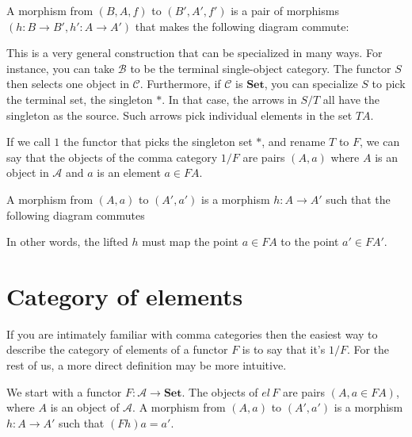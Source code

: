 \documentclass[11pt]{amsart}
\newcommand{\Cat}[1]{\mathbf{#1}}
\newcommand{\cat}[1]{\mathcal{#1}}
\begin{document}
 A morphism from $(B, A, f)$ to $(B', A', f')$ is a pair of morphisms $(h \colon B \to B', h' \colon A \to A')$ that makes the following diagram commute:
 
 \begin{figure}[H]
\centering
{}
\end{figure}

This is a very general construction that can be specialized in many ways. For instance, you can take $\cat B$ to be the terminal single-object category. The functor $S$ then selects one object in $\cat C$. Furthermore, if $\cat C$ is  $\Cat{Set}$, you can specialize $S$ to pick the terminal set, the singleton $*$. In that case, the arrows in $S / T$ all have the singleton as the source. Such arrows pick individual elements in the set $T A$. 

If we call $1$ the functor that picks the singleton set $*$, and rename $T$ to $F$, we can say that the objects of the comma category $1 / F$ are pairs $(A, a)$ where $A$ is an object in $\cat A$ and $a$ is an element $a \in F A$.

A morphism from $(A, a)$ to $(A', a')$ is a morphism $h \colon A \to A'$ such that the following diagram commutes

\begin{figure}[H]
\centering
{}
\end{figure}
In other words, the lifted $h$ must map the point $a \in F A$ to the point $a' \in F A'$.

\section{Category of elements}

If you are intimately familiar with comma categories then the easiest way to describe the category of elements of a functor $F$ is to say that it's $1 / F$. For the rest of us, a more direct definition may be more intuitive. 

We start with a functor $F \colon \cat A \to \Cat{Set}$. The objects of $el \, F$ are pairs $(A, a \in F A)$, where $A$ is an object of $\cat A$. A morphism from $(A, a)$ to $(A', a')$ is a morphism $h \colon A \to A'$ such that $(F h) a = a'$. 
\end{document}
